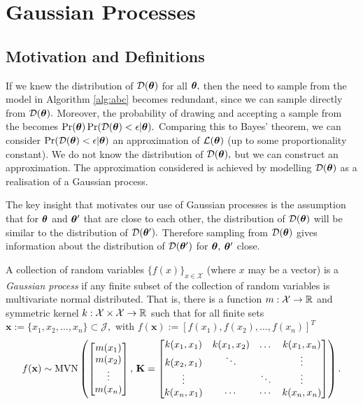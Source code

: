 \chapter{Gaussian Processes}

\section{Motivation and Definitions}

If we knew the distribution of $\mathcal{D}(\bm{\theta})$ for all $\bm{\theta},$ then the need 
to sample from the model in Algorithm
\ref{alg:abc} becomes redundant, since we can sample directly from
$\mathcal{D}(\bm{\theta}).$ Moreover, the probability of drawing and accepting a sample
from the becomes $\Pr(\bm{\theta})\Pr(\mathcal{D}(\bm{\theta}) < \epsilon | \bm{\theta}).$ Comparing
this to Bayes' theorem, we can consider $\Pr(\mathcal{D}(\bm{\theta}) < \epsilon | \bm{\theta})$
an approximation of $\operatorname{\mathcal{L}}(\bm{\theta})$ (up to some proportionality constant).
We do not know the distribution of $\mathcal{D}(\bm{\theta}),$ but we can construct 
an approximation. The approximation considered is achieved by modelling
$\mathcal{D}(\bm{\theta})$ 
as a realisation of a Gaussian process.

The key insight that motivates our use of Gaussian processes is the 
assumption that for $\bm{\theta}$ and $\bm{\theta}^\prime$ that are close to each other,
the distribution of $\mathcal{D}(\bm{\theta})$ will be similar to the distribution of 
$\mathcal{D}(\bm{\theta}^\prime).$ Therefore sampling from $\mathcal{D}(\bm{\theta})$ gives information
about the distribution of $\mathcal{D}(\bm{\theta}^\prime)$ for $\bm{\theta},$ 
$\bm{\theta}^\prime$ close.

\begin{definition}\label{def:gp}
    A collection of random variables $\{f(x)\}_{x\in\mathcal{X}}$
    (where $x$ may be a vector) is a \emph{Gaussian process} if any finite
    subset of the collection of random variables is multivariate normal
    distributed. That is, there is a function $m:\mathcal{X}\to\mathbb{R}$ and
    symmetric kernel $k:\mathcal{X}\times\mathcal{X}\to \mathbb{R}$ such that for all
    finite sets
    $\mathbf{x} :=\{x_1, x_2, \dots, x_n\} \subset \mathcal{J},$ with
    $f(\mathbf{x}) := [f(x_1), f(x_2), \dots, f(x_n)]^T$
    $$f(\mathbf{x}) \sim
        \operatorname{MVN}\left(\begin{bmatrix}
            m(x_1) \\ m(x_2)\\ \vdots\\ m(x_n)
        \end{bmatrix},\, \mathbf{K} = \begin{bmatrix}
            k(x_1, x_1) & k(x_1, x_2) & \dots  & k(x_1, x_n) \\
            k(x_2, x_1) & \ddots      &        & \vdots      \\
            \vdots      &             & \ddots & \vdots      \\
            k(x_n, x_1) & \cdots      & \cdots & k(x_n, x_n)
        \end{bmatrix}\right).$$
\end{definition}

